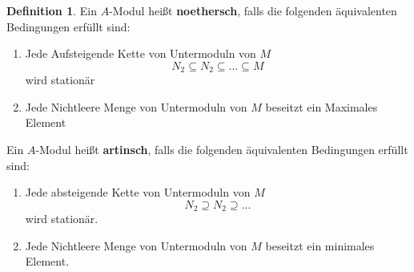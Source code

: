 \documentclass[10pt,a4paper]{article}
\newcounter{thm}[section]
\theoremstyle{definition}
\newtheorem{definition}[thm]{Definition}
\theoremstyle{plain}
\theoremstyle{remark}
\begin{document}
\begin{definition}
	Ein $A$-Modul heißt \textbf{noethersch}, falls die folgenden äquivalenten Bedingungen erfüllt sind:
	\begin{enumerate}
		\item Jede Aufsteigende Kette von Untermoduln von $M$
		\[N_2\subseteq N_2\subseteq...\subseteq M\]
		wird stationär
		\item Jede Nichtleere Menge von Untermoduln von $M$ beseitzt ein Maximales Element
	\end{enumerate}
	Ein $A$-Modul heißt \textbf{artinsch}, falls die folgenden äquivalenten Bedingungen erfüllt sind:
	\begin{enumerate}
		\item Jede absteigende Kette von Untermoduln von $M$
		\[N_2\supseteq N_2\supseteq...\]
		wird stationär.
		\item Jede Nichtleere Menge von Untermoduln von $M$ beseitzt ein minimales Element.
	\end{enumerate}
\end{definition}
\end{document}
